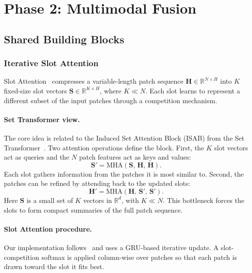 \documentclass[11pt,a4paper]{article}
\begin{document}
\section{Phase 2: Multimodal Fusion}

\subsection{Shared Building Blocks}

\subsubsection{Iterative Slot Attention}
\label{sec:slots}

Slot Attention~\cite{locatello2020slots} compresses a variable-length patch
sequence $\mathbf{H}\in\mathbb{R}^{N\times H}$ into $K$ fixed-size slot
vectors $\mathbf{S}\in\mathbb{R}^{K\times H}$, where $K \ll N$.
Each slot learns to represent a different subset of the input patches through
a competition mechanism.

\paragraph{Set Transformer view.}
The core idea is related to the Induced Set Attention Block (ISAB) from the
Set Transformer~\cite{lee2019settransformer}.
Two attention operations define the block.
First, the $K$ slot vectors act as queries and the $N$ patch features act as
keys and values:
\begin{equation}
    \mathbf{S}' = \mathrm{MHA}(\mathbf{S},\,\mathbf{H},\,\mathbf{H}).
    \label{eq:mab}
\end{equation}
Each slot gathers information from the patches it is most similar to.
Second, the patches can be refined by attending back to the updated slots:
\begin{equation}
    \mathbf{H}' = \mathrm{MHA}(\mathbf{H},\,\mathbf{S}',\,\mathbf{S}').
    \label{eq:sab}
\end{equation}
Here $\mathbf{S}$ is a small set of $K$ vectors in $\mathbb{R}^d$, with
$K \ll N$.
This bottleneck forces the slots to form compact summaries of the full patch
sequence.

\paragraph{Slot Attention procedure.}
Our implementation follows~\cite{locatello2020slots} and uses a GRU-based
iterative update.
A slot-competition softmax is applied column-wise over patches so that each
patch is drawn toward the slot it fits best.
\end{document}
